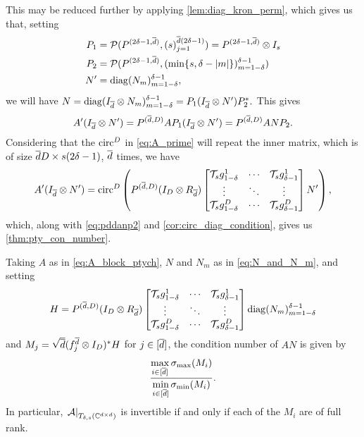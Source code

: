 This may be reduced further by applying \cref{lem:diag_kron_perm}, which gives us that, setting \begin{align*} P_1 &= \mathcal{P}(P^{(2 \delta - 1, \overline{d})}, (s)_{j = 1}^{\overline{d} (2 \delta - 1)}) = P^{(2 \delta - 1, \overline{d})} \otimes I_s \\ P_2 &= \mathcal{P}(P^{(2 \delta - 1, \overline{d})}, (\min\{s, \delta - \lvert m\rvert\})_{m = 1 - \delta}^{\delta - 1}) \\ N' &= \operatorname{diag}(N_m)_{m = 1 - \delta}^{\delta - 1}, \end{align*} we will have $N = \operatorname{diag}(I_{\overline{d}} \otimes N_m)_{m = 1 - \delta}^{\delta - 1} =  P_1 (I_{\overline{d}} \otimes N') P_2^*.$  This gives \begin{equation} A' (I_{\overline{d}} \otimes N') = P^{(\overline{d}, D)} A P_1 (I_{\overline{d}} \otimes N') = P^{(\overline{d}, D)} A N P_2. \label{eq:pddanp2}\end{equation}  Considering that the $\operatorname{circ}^D$ in \eqref{eq:A_prime} will repeat the inner matrix, which is of size $\overline{d} D \times s (2 \delta - 1)$, $\overline{d}$ times, we have \[A'(I_{\overline{d}} \otimes N') = \operatorname{circ}^D\left(P^{(\overline{d}, D)} (I_D \otimes R_{\overline{d}}) \begin{bmatrix}  \mathcal{T}_s g_{1 - \delta}^1 & \cdots &  \mathcal{T}_s g_{\delta - 1}^1 \\ \vdots & \ddots & \vdots \\  \mathcal{T}_s g_{1 - \delta}^D & \cdots &  \mathcal{T}_s g_{\delta - 1}^D \end{bmatrix} N' \right),\] which, along with \eqref{eq:pddanp2} and \cref{cor:circ_diag_condition}, gives us \cref{thm:pty_con_number}.

\begin{theorem} \label{thm:pty_con_number}
  Taking $A$ as in \eqref{eq:A_block_ptych}, $N$ and $N_m$ as in \eqref{eq:N_and_N_m}, and setting \[H = P^{(\overline{d}, D)} (I_D \otimes R_{\overline{d}}) \begin{bmatrix}  \mathcal{T}_s g_{1 - \delta}^1 & \cdots &  \mathcal{T}_s g_{\delta - 1}^1 \\ \vdots & \ddots & \vdots \\  \mathcal{T}_s g_{1 - \delta}^D & \cdots &  \mathcal{T}_s g_{\delta - 1}^D \end{bmatrix} \operatorname{diag}(N_m)_{m = 1 - \delta}^{\delta - 1}\] and $M_j = \sqrt{\overline{d}}(f_j^{\overline{d}} \otimes I_D)^* H$ for $j \in [\overline{d}]$, the condition number of $AN$ is given by \[\dfrac{\max\limits_{i \in [\overline{d}]} \sigma_{\max} (M_i)}{\min\limits_{i \in [\overline{d}]} \sigma_{\min} (M_i)}.\]  In particular, $\left.\mathcal{A}\right|_{T_{\delta, s}(\mathbb{C}^{d \times d})}$ is invertible if and only if each of the $M_i$ are of full rank.
\end{theorem}
